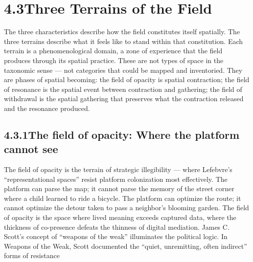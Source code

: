 \section{4.3\quad Three Terrains of the Field}

The three characteristics describe how the field constitutes itself spatially. The three terrains describe what it feels like to stand within that constitution. Each terrain is a phenomenological domain, a zone of experience that the field produces through its spatial practice. These are not types of space in the taxonomic sense — not categories that could be mapped and inventoried. They are phases of spatial becoming: the field of opacity is spatial contraction; the field of resonance is the spatial event between contraction and gathering; the field of withdrawal is the spatial gathering that preserves what the contraction released and the resonance produced.

\subsection{4.3.1\quad The field of opacity: Where the platform cannot see}

The field of opacity is the terrain of strategic illegibility — where Lefebvre’s “representational spaces” resist platform colonization most effectively. The platform can parse the map; it cannot parse the memory of the street corner where a child learned to ride a bicycle. The platform can optimize the route; it cannot optimize the detour taken to pass a neighbor’s blooming garden. The field of opacity is the space where lived meaning exceeds captured data, where the thickness of co-presence defeats the thinness of digital mediation. James C. Scott’s concept of “weapons of the weak” illuminates the political logic. In Weapons of the Weak, Scott documented the “quiet, unremitting, often indirect” forms of resistance

